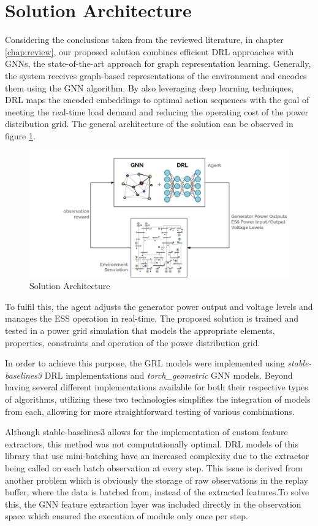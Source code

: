 \section{Solution Architecture} \label{sec:method-arch}

Considering the conclusions taken from the reviewed literature, in chapter \ref{chap:review}, our proposed solution combines efficient \acf{DRL} approaches with \acfp{GNN}, the state-of-the-art approach for graph representation learning. Generally, the system receives graph-based representations of the environment and encodes them using the \ac{GNN} algorithm. By also leveraging deep learning techniques, \ac{DRL} maps the encoded embeddings to optimal action sequences with the goal of meeting the real-time load demand and reducing the operating cost of the power distribution grid. The general architecture of the solution can be observed in figure \ref{fig:arch}.

\begin{figure}
	\centering
	\includegraphics[width=0.85\linewidth]{./figures/arch.png}
	\caption{Solution Architecture}
	\label{fig:arch}
\end{figure}


To fulfil this, the agent adjusts the generator power output and voltage levels and manages the \ac{ESS} operation in real-time. The proposed solution is trained and tested in a power grid simulation that models the appropriate elements, properties, constraints and operation of the power distribution grid. \par
In order to achieve this purpose, the \ac{GRL} models were implemented using \textit{stable-baselines3} \ac{DRL} implementations and \textit{torch\_geometric} \ac{GNN} models. Beyond having several different implementations available for both their respective types of algorithms, utilizing these two technologies simplifies the integration of models from each, allowing for more straightforward testing of various combinations. \par
Although stable-baselines3 allows for the implementation of custom feature extractors, this method was not computationally optimal. \ac{DRL} models of this library that use mini-batching have an increased complexity due to the extractor being called on each batch observation at every step. This issue is derived from another problem which is obviously the storage of raw observations in the replay buffer, where the data is batched from, instead of the extracted features.To solve this, the \ac{GNN} feature extraction layer was included directly in the observation space which ensured the execution of module only once per step. \par



